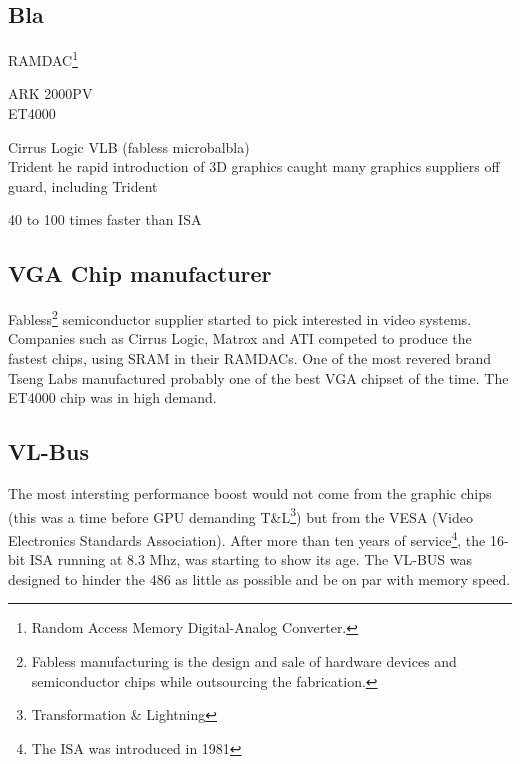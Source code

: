 \subsection{Bla}
RAMDAC\footnote{Random Access Memory Digital-Analog Converter.}
\par
ARK 2000PV\\
ET4000\\
\par
Cirrus Logic VLB (fabless microbalbla)\\
Trident he rapid introduction of 3D graphics caught many graphics suppliers off guard, including Trident\\
\par
\par
{}
\par
40 to 100 times faster than ISA\\
\par
\subsection{VGA Chip manufacturer}
Fabless\footnote{Fabless manufacturing is the design and sale of hardware devices and semiconductor chips while outsourcing the fabrication.} semiconductor supplier started to pick interested in video systems. Companies such as Cirrus Logic, Matrox and ATI competed to produce the fastest chips, using SRAM in their RAMDACs. One of the most revered brand Tseng Labs manufactured probably one of the best VGA chipset of the time. The ET4000 chip was in high demand.\\
\par
{}
\par


\subsection{VL-Bus}
The most intersting performance boost would not come from the graphic chips (this was a time before GPU demanding T\&L\footnote{Transformation \& Lightning}) but from the VESA (Video Electronics Standards Association). After more than ten years of service\footnote{The ISA was introduced in 1981}, the 16-bit ISA running at 8.3 Mhz, was starting to show its age. The VL-BUS was designed to hinder the 486 as little as possible and be on par with memory speed.
\par
{}

